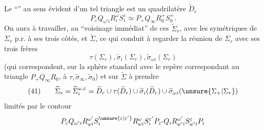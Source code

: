 Le ``''  au sens évident d'un tel triangle est un quadrilatère $\widetilde D_r$
\[
P_\varepsilon Q_{\omega'i}R_i^\omega S_i^\varepsilon\simeq P_+Q_\infty R_0^+S_0^+.
\]
On aura à travailler, au ``voisinage immédiat'' de ces    $\widetilde\Sigma_r$, avec les symétriques de $\Sigma_r$ p.r. à ses trois côtés, et  $\widetilde\Sigma$,  ce qui conduit à regarder la réunion de $\Sigma_r$ avec ses trois frères
\[
\tau(\Sigma_r),\widetilde\sigma_i(\Sigma_r),\widetilde\sigma_{\omega i}(\Sigma_r)
\]
(qui  correspondent, sur la sphère standard avec le repère correspondant au triangle $P_+Q_\infty R_0$, à $\tau,\widetilde\sigma_\infty,\widetilde\sigma_0$) et sur $\widetilde\Sigma$ à prendre
\[
(41)\qquad\widetilde\Sigma_r=\widetilde\Sigma_i^{\omega,\varepsilon}=\widetilde D_r\cup\tau(\widetilde D_r)\cup\widetilde\sigma_i(\widetilde D_r)\cup\widetilde\sigma_{\omega i}(\unsure{\Sigma_+|\Sigma_r})
\]
limités par le contour
\[
P_\varepsilon Q_{\omega'i}R_{\omega i}^{\omega'}S_i^{\unsure{\varepsilon|\varepsilon'}}R_{\omega i}^{\omega}S_i^{\varepsilon'}P_{\varepsilon'}Q_iR_{\omega'i}^{\omega'}S_{\omega'i}^\varepsilon P_\varepsilon
\]
